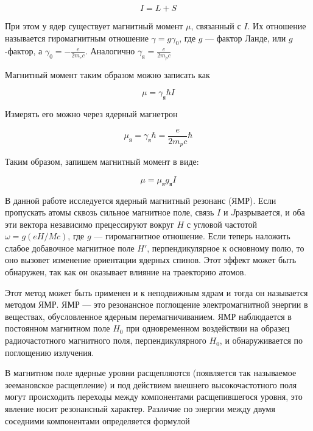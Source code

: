 \documentclass[12pt]{kiarticle}
\begin{document}
	\begin{equation}\label{}
	I = L + S
	\end{equation} 
	
	При этом у ядер существует магнитный момент $ \mu $, связанный с $ I $. Их отношение называется гиромагнитным отношение $ \gamma = g \gamma_0 $, где $ g $ --- фактор Ланде, или $ g $-фактор, а $ \gamma_0 = -\frac{e}{2m_ec} $. Аналогично  $ \gamma_я = \frac{e}{2m_pc} $
	
	Магнитный момент таким образом можно записать как 
	
	\begin{equation}\label{}
	\mu = \gamma_я \hbar I 
	\end{equation}
	
	Измерять его можно через ядерный магнетрон
	
	\begin{equation}\label{}
	\mu_я = \gamma_я \hbar = \frac{e}{2m_pc} \hbar 
	\end{equation}
	
	Таким образом, запишем магнитный момент в виде:
	
	\begin{equation}\label{mu}
	\mu = \mu_я g_я I
	\end{equation}

	
	В данной работе исследуется ядерный магнитный резонанс (ЯМР). Если пропускать
	атомы сквозь сильное магнитное поле, связь $ I $ и $ J  $разрывается, и
	оба эти вектора независимо прецессируют вокруг $ H $ с угловой частотой
	$ \omega = g(eH/Mc) $, где $ g $ --- гиромагнитное отношение. Если теперь наложить слабое добавочное магнитное поле $ H' $, перпендикулярное к основному полю, то оно вызовет изменение ориентации ядерных спинов.
	Этот эффект может быть обнаружен, так как он оказывает влияние
	на траекторию атомов.
	
	Этот метод может быть применен и к неподвижным ядрам и тогда он называется методом ЯМР. ЯМР --- это резонансное поглощение
	электромагнитной энергии в веществах, обусловленное ядерным перемагничиванием. ЯМР наблюдается в постоянном магнитном поле $ H_0 $ при одновременном воздействии на образец радиочастотного магнитного поля, перпендикулярного $ H_0 $, и обнаруживается по поглощению излучения. 
	
	В магнитном поле ядерные уровни расщепляются (появляется так называемое зеемановское расщепление) и под действием внешнего высокочастотного поля могут происходить переходы между компонентами расщепившегося уровня, это явление носит резонансный характер. Различие по энергии между двумя соседними компонентами определяется формулой
	
\end{document}
